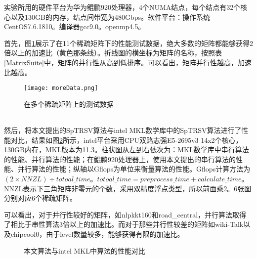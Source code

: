 实验所用的硬件平台为华为鲲鹏920处理器，4个NUMA结点，每个结点有32个核心以及130GB的内存，结点间带宽为480Gbps。软件平台：操作系统CentOS7.6.1810。编译器gcc9.0。openmp4.5。

首先，图\ref{在多个稀疏矩阵上的测试数据}展示了在11个稀疏矩阵下的性能测试数据，绝大多数的矩阵都能够获得2倍以上的加速比（黄色那条线）。折线图的横坐标为矩阵的名称，按照表\ref{MatrixSuite}中，矩阵的并行性从高到低排序。可以看出，矩阵并行性越高，加速比越高。

\begin{figure}[htbp]
    \centering
    \texttt{[image: moreData.png]}
    \caption{在多个稀疏矩阵上的测试数据}
    \label{在多个稀疏矩阵上的测试数据}
\end{figure}

~\\

然后，将本文提出的SpTRSV算法与intel MKL数学库中的SpTRSV算法进行了性能对比，结果如图\ref{SpTRSVMulti-paltform}所示，intel平台采用CPU双路志强E5-2695v3 14x2个核心，130GB内存，MKL版本为11.3。柱状图从左到右依次为：MKL数学库中串行算法的性能、并行算法的性能；在鲲鹏920处理器上，使用本文提出的串行算法的性能、并行算法的性能；纵轴以Gflops为单位来衡量算法的性能。Gflops计算方法为$(2 \times NNZL)  \div totoal\_time$。$totoal\_time = preprocess\_time + calculate\_time$。NNZL表示下三角矩阵非零元的个数，采用双精度浮点类型，所以前面乘2。6张图分别对应6个稀疏矩阵。

可以看出，对于并行性较好的矩阵，如nlpkkt160和road\_central，并行算法取得了相比于串性算法3倍以上的加速比。而对于那些并行性较差的矩阵如wiki-Talk以及chipcool0，由于level数量较多，能够获得有限的加速比。

\begin{figure}[htbp]
    \centering
    \quad
    \quad
    \quad
    \quad
    \quad
    \caption{本文算法与intel MKL中算法的性能对比}
    \label{SpTRSVMulti-paltform}
\end{figure}

